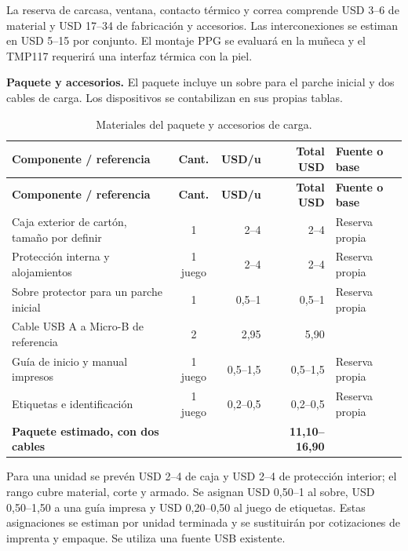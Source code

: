La reserva de carcasa, ventana, contacto térmico y correa comprende USD 3--6 de material y USD 17--34 de fabricación y accesorios. Las interconexiones se estiman en USD 5--15 por conjunto. El montaje PPG se evaluará en la muñeca y el TMP117 requerirá una interfaz térmica con la piel.

\noindent\textbf{Paquete y accesorios.}
El paquete incluye un sobre para el parche inicial y dos cables de carga. Los dispositivos se contabilizan en sus propias tablas.
{\footnotesize
\setlength{\tabcolsep}{4pt}
\renewcommand{\arraystretch}{1.18}
\begin{xltabular}{\linewidth}{@{}>{\raggedright\arraybackslash}X c r r >{\raggedright\arraybackslash}p{2.2cm}@{}}
\caption{Materiales del paquete y accesorios de carga.}\label{tab:costo-caja}\\
\toprule
\textbf{Componente / referencia} & \textbf{Cant.} & \textbf{USD/u} & \textbf{Total USD} & \textbf{Fuente o base}\\
\midrule
\endfirsthead
\toprule
\textbf{Componente / referencia} & \textbf{Cant.} & \textbf{USD/u} & \textbf{Total USD} & \textbf{Fuente o base}\\
\midrule
\endhead
\bottomrule\endfoot


Caja exterior de cartón, tamaño por definir & 1 & 2--4 & 2--4 & Reserva propia\\
Protección interna y alojamientos & 1 juego & 2--4 & 2--4 & Reserva propia\\
Sobre protector para un parche inicial & 1 & 0,5--1 & 0,5--1 & Reserva propia\\
Cable USB A a Micro-B de referencia & 2 & 2,95 & 5,90 & \\
Guía de inicio y manual impresos & 1 juego & 0,5--1,5 & 0,5--1,5 & Reserva propia\\
Etiquetas e identificación & 1 juego & 0,2--0,5 & 0,2--0,5 & Reserva propia\\
\midrule
\textbf{Paquete estimado, con dos cables} & & & \textbf{11,10--16,90} & \\
\bottomrule
\end{xltabular}
}

Para una unidad se prevén USD 2--4 de caja y USD 2--4 de protección interior; el rango cubre material, corte y armado. Se asignan USD 0,50--1 al sobre, USD 0,50--1,50 a una guía impresa y USD 0,20--0,50 al juego de etiquetas. Estas asignaciones se estiman por unidad terminada y se sustituirán por cotizaciones de imprenta y empaque. Se utiliza una fuente USB existente.

